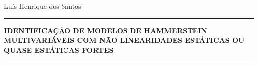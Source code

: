 \begin{titlepage}
\vspace{3cm}
\begin{center}
	
{\normalsize Luís Henrique dos Santos}\\[4cm]
\thickhrulefill
\par\nobreak
\vspace*{10\p@}%
\hrule
\vspace*{10\p@}%
{\bf \normalsize \bfseries {IDENTIFICAÇÃO DE MODELOS DE HAMMERSTEIN \\MULTIVARIÁVEIS COM NÃO LINEARIDADES ESTÁTICAS OU\\ QUASE ESTÁTICAS FORTES}}
\vspace*{10\p@}%
\hrule
\vspace*{40\p@}%
\end{center}

\vspace{7cm}

\end{titlepage}
